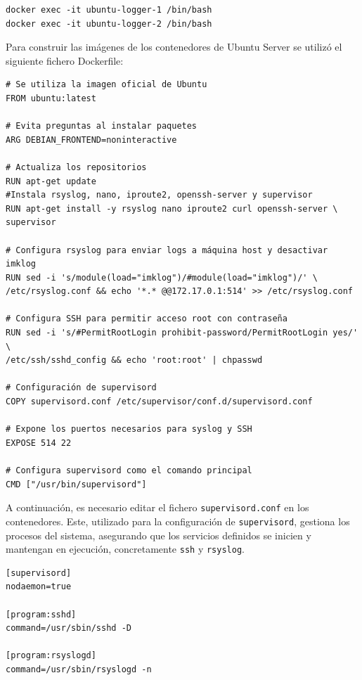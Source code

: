 \begin{mdframed}
\footnotesize
\begin{verbatim}
docker exec -it ubuntu-logger-1 /bin/bash
docker exec -it ubuntu-logger-2 /bin/bash
\end{verbatim}
\end{mdframed}

Para construir las imágenes de los contenedores de Ubuntu Server \cite{ubuntu_server} se utilizó el siguiente fichero Dockerfile:

\begin{center}
\begin{mdframed}
\footnotesize
    \begin{verbatim}
# Se utiliza la imagen oficial de Ubuntu
FROM ubuntu:latest

# Evita preguntas al instalar paquetes
ARG DEBIAN_FRONTEND=noninteractive

# Actualiza los repositorios
RUN apt-get update
#Instala rsyslog, nano, iproute2, openssh-server y supervisor
RUN apt-get install -y rsyslog nano iproute2 curl openssh-server \
supervisor

# Configura rsyslog para enviar logs a máquina host y desactivar imklog
RUN sed -i 's/module(load="imklog")/#module(load="imklog")/' \
/etc/rsyslog.conf && echo '*.* @@172.17.0.1:514' >> /etc/rsyslog.conf

# Configura SSH para permitir acceso root con contraseña
RUN sed -i 's/#PermitRootLogin prohibit-password/PermitRootLogin yes/' \
/etc/ssh/sshd_config && echo 'root:root' | chpasswd

# Configuración de supervisord
COPY supervisord.conf /etc/supervisor/conf.d/supervisord.conf

# Expone los puertos necesarios para syslog y SSH
EXPOSE 514 22

# Configura supervisord como el comando principal
CMD ["/usr/bin/supervisord"]
    \end{verbatim}
\end{mdframed}
\end{center}

\newpage

A continuación, es necesario editar el fichero \texttt{supervisord.conf} en los contenedores. Este, utilizado para la configuración de  \texttt{supervisord}, gestiona los procesos del sistema, asegurando que los servicios definidos se inicien y mantengan en ejecución, concretamente \texttt{ssh} y \texttt{rsyslog}. 

\begin{center}
\begin{mdframed}
\footnotesize
    \begin{verbatim}
[supervisord]
nodaemon=true

[program:sshd]
command=/usr/sbin/sshd -D

[program:rsyslogd]
command=/usr/sbin/rsyslogd -n
    \end{verbatim}
\end{mdframed}
\end{center}


